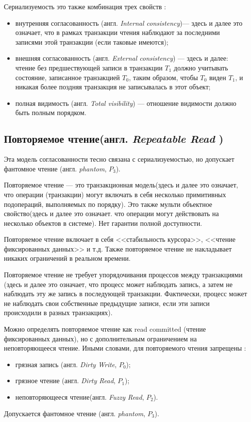 \documentclass[12pt,  openany]{book}
\begin{document}
\par
Сериализуемость это также комбинация трех свойств \cite{cerone_et_al}:
\begin{itemize}
\item внутренняя согласованность (англ. \textit{Internal consistency})--- здесь и далее это означает, что в рамках транзакции чтения наблюдают за последними записями этой транзакции (если таковые имеются);
\item внешняя согласованность (англ. \textit{External consistency}) --- здесь и далее: чтение без предшествующей записи в транзакции $T_1$ должно учитывать состояние, записанное транзакцией $T_0$, таким образом, чтобы $T_0$ виден $T_1$, и никакая более поздняя транзакция не записывалась в этот объект;
\item полная видимость (англ. \textit{Total visibility}) --- отношение видимости должно быть полным порядком.
\end{itemize}

\subsection{Повторяемое чтение(англ.  \textit{Repeatable Read })}
Эта модель согласованности тесно связана с сериализуемостью, но допускает фантомное чтение (англ. \textit{phantom}, $P_3$).
\par
Повторяемое чтение --- это транзакционная модель(здесь и далее это означает, что операции (транзакции) могут включать в себя несколько примитивных подопераций, выполняемых по порядку).  Это также мульти объектное свойство(здесь и далее это означает. что операции могут действовать на несколько объектов в системе). Нет гарантии полной доступности.
\par
Повторяемое чтение включает в себя <<стабильность курсора>>, <<чтение фиксированных данных>> и т.д.
Также повторяемое чтение не накладывает никаких ограничений в реальном времени.
\par
Повторяемое чтение не требует упорядочивания процессов между транзакциями (здесь и далее это означает, что процесс может наблюдать запись, а затем не наблюдать эту же запись в последующей транзакции. Фактически, процесс может не наблюдать свои собственные предыдущие записи, если эти записи происходили в разных транзакциях).
\par
Можно определять повторяемое чтение как  read committed (чтение фиксированных данных), но с дополнительным ограничением на неповторяющееся чтение.
Иными словами, для повторяемого чтения запрещены \cite{IsolationLevelDefinitions}:
\begin{itemize}
  \item грязная запись (англ.  \textit{Dirty Write},  $P_0$);
  \item грязное чтение (англ. \textit{Dirty Read}, $P_1$);
  \item неповторяющееся чтение(англ. \textit{Fuzzy Read}, $P_2$).
\end{itemize}
Допускается фантомное чтение (англ. \textit{phantom}, $P_3$).
\end{document}

